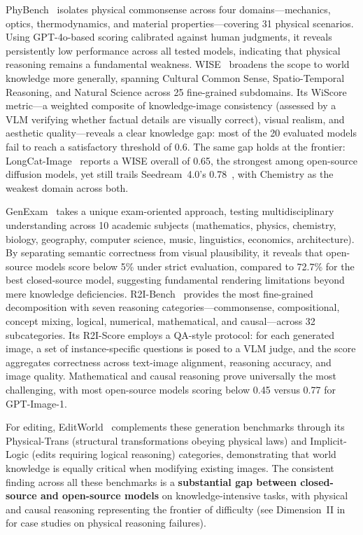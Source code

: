 \documentclass{llmxive}
\begin{document}
PhyBench~\citep{meng2024phybench} isolates physical commonsense across four domains---mechanics, optics, thermodynamics, and material properties---covering 31 physical scenarios. Using GPT-4o-based scoring calibrated against human judgments, it reveals persistently low performance across all tested models, indicating that physical reasoning remains a fundamental weakness. WISE~\citep{niu2025wise} broadens the scope to world knowledge more generally, spanning Cultural Common Sense, Spatio-Temporal Reasoning, and Natural Science across 25 fine-grained subdomains. Its WiScore metric---a weighted composite of knowledge-image consistency (assessed by a VLM verifying whether factual details are visually correct), visual realism, and aesthetic quality---reveals a clear knowledge gap: most of the 20 evaluated models fail to reach a satisfactory threshold of 0.6. The same gap holds at the frontier: LongCat-Image~\citep{team2025longcat} reports a WISE overall of 0.65, the strongest among open-source diffusion models, yet still trails Seedream~4.0's 0.78~\citep{seedream2025seedream}, with Chemistry as the weakest domain across both.

GenExam~\citep{GenExam} takes a unique exam-oriented approach, testing multidisciplinary understanding across 10 academic subjects (mathematics, physics, chemistry, biology, geography, computer science, music, linguistics, economics, architecture). By separating semantic correctness from visual plausibility, it reveals that open-source models score below 5\% under strict evaluation, compared to 72.7\% for the best closed-source model, suggesting fundamental rendering limitations beyond mere knowledge deficiencies. R2I-Bench~\citep{chen2025r2ibench} provides the most fine-grained decomposition with seven reasoning categories---commonsense, compositional, concept mixing, logical, numerical, mathematical, and causal---across 32 subcategories. Its R2I-Score employs a QA-style protocol: for each generated image, a set of instance-specific questions is posed to a VLM judge, and the score aggregates correctness across text-image alignment, reasoning accuracy, and image quality. Mathematical and causal reasoning prove universally the most challenging, with most open-source models scoring below 0.45 versus 0.77 for GPT-Image-1.

For editing, EditWorld~\citep{EditWorld} complements these generation benchmarks through its Physical-Trans (structural transformations obeying physical laws) and Implicit-Logic (edits requiring logical reasoning) categories, demonstrating that world knowledge is equally critical when modifying existing images. The consistent finding across all these benchmarks is a \textbf{substantial gap between closed-source and open-source models} on knowledge-intensive tasks, with physical and causal reasoning representing the frontier of difficulty (see Dimension~II in  for case studies on physical reasoning failures).
\end{document}
